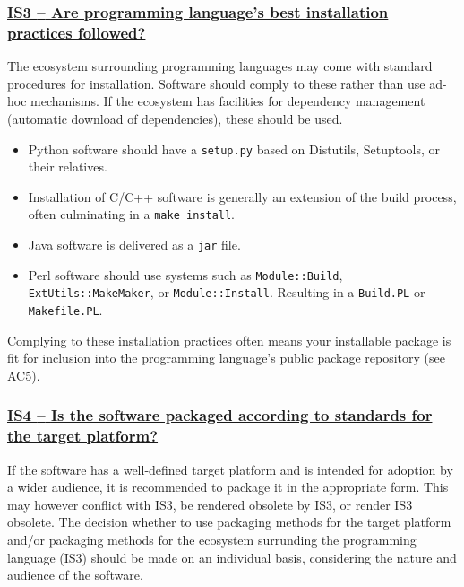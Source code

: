 \documentclass[a4paper,11pt]{article}
\newcommand{\indicator}[1]{\subsubsection*{\underline{#1}}}
\begin{document}
\newcommand{\isThreeName}{IS3}
\newcommand{\isThreeID}{\isThreeName}
\newcommand{\isThreeText}{Are programming language's best installation practices followed?}
\indicator{\isThreeName{ }--{ }\isThreeText}\label{id:is3} 

The ecosystem surrounding programming languages may come with standard
procedures for installation. Software should comply to these rather than use
ad-hoc mechanisms. If the ecosystem has facilities for dependency management
(automatic download of dependencies), these should be used.

\begin{itemize}
 \item Python software should have a \texttt{setup.py} based on Distutils,
     Setuptools, or their relatives.
 \item Installation of C/C++ software is generally an extension of the build
     process, often culminating in a \texttt{make install}.
 \item Java software is delivered as a \texttt{jar} file.
 \item Perl software should use systems such as \texttt{Module::Build},
     \texttt{ExtUtils::MakeMaker}, or \texttt{Module::Install}. Resulting in a
     \texttt{Build.PL} or \texttt{Makefile.PL}.
\end{itemize}

Complying to these installation practices often means your installable package
is fit for inclusion into the programming language's public package repository
(see AC5).

\newcommand{\isFourName}{IS4}
\newcommand{\isFourID}{\isFourName}
\newcommand{\isFourText}{Is the software packaged according to standards for the target platform?}
\indicator{\isFourName{ }--{ }\isFourText}\label{id:is4} 

If the software has a well-defined target platform and is intended for adoption
by a wider audience, it is recommended to package it in the appropriate form.
This may however conflict with IS3, be rendered obsolete by IS3, or render IS3
obsolete. The decision whether to use packaging methods for the target platform
and/or packaging methods for the ecosystem surrunding the programming language
(IS3) should be
%
%
%
made on an individual basis, considering the nature and audience of the
software.
\end{document}
